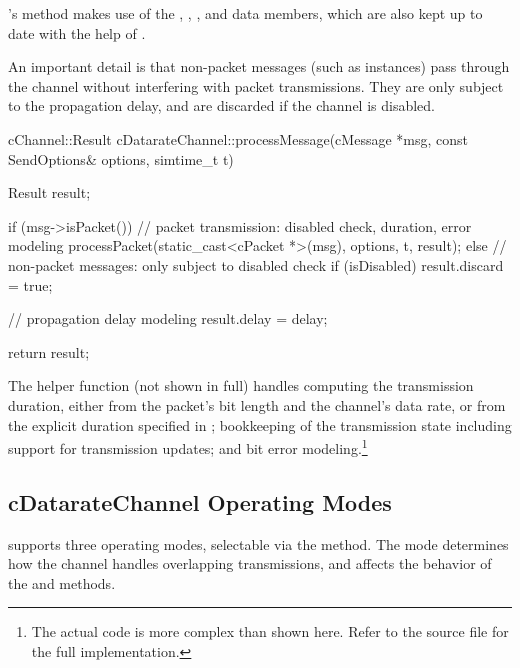 's  method makes use of
the , , , and  data
members, which are also kept up to date with the help of
.

An important detail is that non-packet messages (such as 
instances) pass through the channel without interfering with packet
transmissions. They are only subject to the propagation delay, and are
discarded if the channel is disabled.

\begin{cpp}
cChannel::Result cDatarateChannel::processMessage(cMessage *msg,
                    const SendOptions& options, simtime_t t)
{
    Result result;

    if (msg->isPacket()) {
        // packet transmission: disabled check, duration, error modeling
        processPacket(static_cast<cPacket *>(msg), options, t, result);
    }
    else {
        // non-packet messages: only subject to disabled check
        if (isDisabled)
            result.discard = true;
    }

    // propagation delay modeling
    result.delay = delay;

    return result;
}
\end{cpp}

The  helper function (not shown in full) handles
computing the transmission duration, either from the packet's bit length
and the channel's data rate, or from the explicit duration specified in
; bookkeeping of the transmission state including
support for transmission updates; and bit error modeling.\footnote{The
actual code is more complex than shown here. Refer to the source file
 for the full implementation.}


\subsection{cDatarateChannel Operating Modes}
\label{sec:simple-modules:dataratechannel-modes}

 supports three operating modes, selectable via the
 method. The mode determines how the channel handles
overlapping transmissions, and affects the behavior of the
 and  methods.

